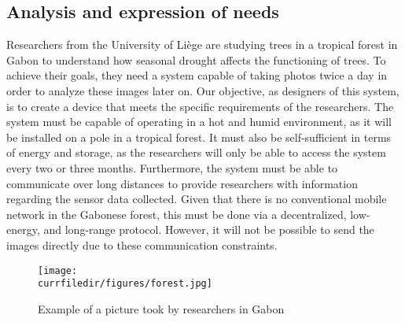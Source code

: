 \subsection{Analysis and expression of needs}
Researchers from the University of Liège are studying trees in a tropical forest in Gabon to understand how seasonal drought affects the functioning of trees. To achieve their goals, they need a system capable of taking photos twice a day in order to analyze these images later on.
Our objective, as designers of this system, is to create a device that meets the specific requirements of the researchers. The system must be capable of operating in a hot and humid environment, as it will be installed on a pole in a tropical forest. It must also be self-sufficient in terms of energy and storage, as the researchers will only be able to access the system every two or three months.
Furthermore, the system must be able to communicate over long distances to provide researchers with information regarding the sensor data collected. Given that there is no conventional mobile network in the Gabonese forest, this must be done via a decentralized, low-energy, and long-range protocol. However, it will not be possible to send the images directly due to these communication constraints.


\begin{figure}[h]
    \centering
    \texttt{[image: \\currfiledir/figures/forest.jpg]}
    \caption{Example of a picture took by researchers in Gabon}
    \label{fig:forest}
\end{figure}

